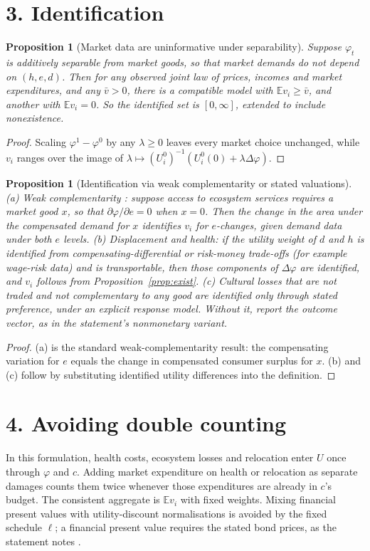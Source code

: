 \documentclass[11pt]{article}
\newtheorem{proposition}[theorem]{Proposition}
\theoremstyle{definition}
\begin{document}
\section*{3. Identification}
\begin{proposition}[Market data are uninformative under separability]\label{prop:sep}
Suppose $\varphi_t$ is additively separable from market goods, so that market demands do not depend on
$(h,e,d)$. Then for any observed joint law of prices, incomes and market expenditures, and any $\bar v>0$, there is a
compatible model with $\mathbb E v_i\ge\bar v$, and another with $\mathbb E v_i=0$. So the identified set is
$[0,\infty]$, extended to include nonexistence.
\end{proposition}
\begin{proof}
Scaling $\varphi^1-\varphi^0$ by any $\lambda\ge0$ leaves every market choice unchanged, while $v_i$ ranges over the
image of $\lambda\mapsto(U^0_i)^{-1}(U^0_i(0)+\lambda\Delta\varphi)$.
\end{proof}
\begin{proposition}[Identification via weak complementarity or stated valuations]\label{prop:wc}
(a) Weak complementarity \cite{maler}: suppose access to ecosystem services requires a market good $x$, so that
$\partial\varphi/\partial e=0$ when $x=0$. Then the change in the area under the compensated demand for $x$ identifies
$v_i$ for $e$-changes, given demand data under both $e$ levels.
(b) Displacement and health: if the utility weight of $d$ and $h$ is identified from compensating-differential or
risk-money trade-offs (for example wage-risk data) and is transportable, then those components of $\Delta\varphi$ are
identified, and $v_i$ follows from Proposition~\ref{prop:exist}.
(c) Cultural losses that are not traded and not complementary to any good are identified only through stated preference,
under an explicit response model. Without it, report the outcome vector, as in the statement's nonmonetary variant.
\end{proposition}
\begin{proof}
(a) is the standard weak-complementarity result: the compensating variation for $e$ equals the change in compensated
consumer surplus for $x$. (b) and (c) follow by substituting identified utility differences into the definition.
\end{proof}

\section*{4. Avoiding double counting}
In this formulation, health costs, ecosystem losses and relocation enter $U$ once through $\varphi$ and $c$. Adding
market expenditure on health or relocation as separate damages counts them twice whenever those expenditures are already
in $c$'s budget. The consistent aggregate is $\mathbb E v_i$ with fixed weights. Mixing financial present values with
utility-discount normalisations is avoided by the fixed schedule $\ell$; a financial present value requires the stated bond
prices, as the statement notes \cite{scc}.
\end{document}
